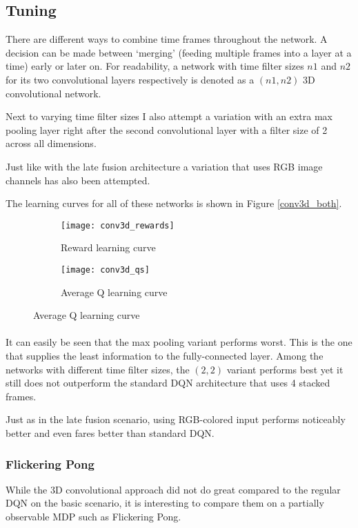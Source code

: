 \subsection{Tuning}
\label{sub:conv3d_tuning}
There are different ways to combine time frames throughout the network.
A decision can be made between `merging'
(feeding multiple frames into a layer at a time)
early or later on.
For readability,
a network with time filter sizes
$n1$ and $n2$ for its two convolutional layers respectively
is denoted as a $(n1, n2)$ 3D convolutional network.

Next to varying time filter sizes
I also attempt a variation with an extra max pooling layer
right after the second convolutional layer
with a filter size of 2 across all dimensions.

Just like with the late fusion architecture
a variation that uses RGB image channels has also been attempted.

The learning curves for all of these networks
is shown in Figure \ref{conv3d_both}.

\begin{figure}[htpb]
  \centering
  \begin{subfigure}[t]{.49\linewidth}
    \caption{Reward learning curve}
    \texttt{[image: conv3d\_rewards]}
  \end{subfigure}
  \begin{subfigure}[t]{.49\linewidth}
    \caption{Average Q learning curve}
    \texttt{[image: conv3d\_qs]}
  \end{subfigure}
  \label{fig:conv3d_both}
\end{figure}

\paragraph{}
It can easily be seen that the max pooling variant
performs worst.
This is the one that supplies the least information
to the fully-connected layer.
Among the networks with different time filter sizes,
the $(2,2)$ variant performs best
yet it still does not outperform
the standard DQN architecture that uses 4 stacked frames.

Just as in the late fusion scenario,
using RGB-colored input performs noticeably better
and even fares better than standard DQN.


\subsubsection{Flickering Pong}
While the 3D convolutional approach
did not do great compared to the regular DQN
on the basic scenario,
it is interesting to compare them
on a partially observable MDP
such as Flickering Pong.

